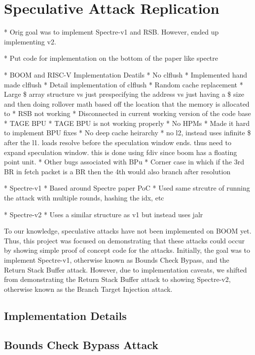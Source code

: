 \section{Speculative Attack Replication}

* Orig goal was to implement Spectre-v1 and RSB. However, ended up implementing v2.

* Put code for implementation on the bottom of the paper like spectre

* BOOM and RISC-V Implementation Deatils
    * No clflush
        * Implemented hand made clflush
            * Detail implementation of clflush
            * Random cache replacement
            * Large \$ array structure vs just prespecifying the address vs just having a \$ size and then doing rollover math based off the location that the memory is allocated to
    * RSB not working
        * Disconnected in current working version of the code base
    * TAGE BPU
        * TAGE BPU is not working properly
    * No HPMs
        * Made it hard to implement BPU fixes
    * No deep cache heirarchy
        * no l2, instead uses infinite \$ after the l1. loads resolve before the speculation window ends. thus need to expand speculation window.
          this is done using fdiv since boom has a floating point unit.
    * Other bugs associated with BPu
        * Corner case in which if the 3rd BR in fetch packet is a BR then the 4th would also branch after resolution

* Spectre-v1
    * Based around Spectre paper PoC
        * Used same strcutre of running the attack with multiple rounds, hashing the idx, etc

* Spectre-v2
    * Uses a similar structure as v1 but instead uses jalr

To our knowledge, speculative attacks have not been implemented on BOOM yet. Thus,
this project was focused on demonstrating that these attacks could occur by showing
simple proof of concept code for the attacks. Initially, the goal was to implement
Spectre-v1, otherwise known as Bounds Check Bypass, and the Return Stack Buffer attack.
However, due to implementation caveats, we shifted from demonstrating the Return Stack 
Buffer attack to showing Spectre-v2, otherwise known as the Branch Target Injection 
attack.

\subsection{Implementation Details}

\subsection{Bounds Check Bypass Attack}

